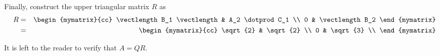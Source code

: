 \begin{solution}
Finally, construct the upper triangular matrix $R$ as 
\begin{eqnarray*}
R &=& 
\begin{mymatrix}{cc}
\vectlength B_1 \vectlength & A_2 \dotprod C_1  \\
0 & \vectlength B_2 
\end{mymatrix} \\
&=& 
\begin{mymatrix}{cc}
\sqrt{2} & \sqrt{2} \\
0 & \sqrt{3} \\
\end{mymatrix}
\end{eqnarray*}

It is left to the reader to verify that $A=QR$. 
\end{solution}
